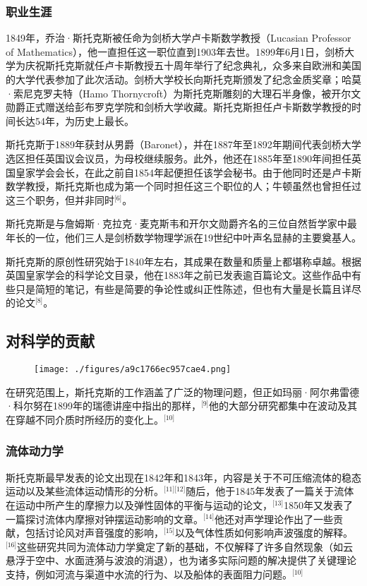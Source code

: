 \subsubsection{职业生涯}
1849年，乔治·斯托克斯被任命为剑桥大学卢卡斯数学教授（Lucasian Professor of Mathematics），他一直担任这一职位直到1903年去世。1899年6月1日，剑桥大学为庆祝斯托克斯就任卢卡斯教授五十周年举行了纪念典礼，众多来自欧洲和美国的大学代表参加了此次活动。剑桥大学校长向斯托克斯颁发了纪念金质奖章；哈莫·索尼克罗夫特（Hamo Thornycroft）为斯托克斯雕刻的大理石半身像，被开尔文勋爵正式赠送给彭布罗克学院和剑桥大学收藏。斯托克斯担任卢卡斯数学教授的时间长达54年，为历史上最长。

斯托克斯于1889年获封从男爵（Baronet），并在1887年至1892年期间代表剑桥大学选区担任英国议会议员，为母校继续服务。此外，他还在1885年至1890年间担任英国皇家学会会长，在此之前自1854年起便担任该学会秘书。由于他同时还是卢卡斯数学教授，斯托克斯也成为第一个同时担任这三个职位的人；牛顿虽然也曾担任过这三个职务，但并非同时\(^\text{[6]}\)。

斯托克斯是与詹姆斯·克拉克·麦克斯韦和开尔文勋爵齐名的三位自然哲学家中最年长的一位，他们三人是剑桥数学物理学派在19世纪中叶声名显赫的主要奠基人。

斯托克斯的原创性研究始于1840年左右，其成果在数量和质量上都堪称卓越。根据英国皇家学会的科学论文目录，他在1883年之前已发表逾百篇论文。这些作品中有些只是简短的笔记，有些是简要的争论性或纠正性陈述，但也有大量是长篇且详尽的论文\(^\text{[8]}\)。
\subsection{对科学的贡献}
\begin{figure}[ht]
\centering
\texttt{[image: ./figures/a9c1766ec957cae4.png]}
\caption{} \label{fig_QZstks_2}
\end{figure}
在研究范围上，斯托克斯的工作涵盖了广泛的物理问题，但正如玛丽·阿尔弗雷德·科尔努在1899年的瑞德讲座中指出的那样，\(^\text{[9]}\)他的大部分研究都集中在波动及其在穿越不同介质时所经历的变化上。\(^\text{[10]}\)
\subsubsection{流体动力学}
斯托克斯最早发表的论文出现在1842年和1843年，内容是关于不可压缩流体的稳态运动以及某些流体运动情形的分析。\(^\text{[11][12]}\)随后，他于1845年发表了一篇关于流体在运动中所产生的摩擦力以及弹性固体的平衡与运动的论文，\(^\text{[13]}\)1850年又发表了一篇探讨流体内摩擦对钟摆运动影响的文章。\(^\text{[14]}\)他还对声学理论作出了一些贡献，包括讨论风对声音强度的影响，\(^\text{[15]}\)以及气体性质如何影响声波强度的解释。\(^\text{[16]}\)这些研究共同为流体动力学奠定了新的基础，不仅解释了许多自然现象（如云悬浮于空中、水面涟漪与波浪的消退），也为诸多实际问题的解决提供了关键理论支持，例如河流与渠道中水流的行为、以及船体的表面阻力问题。\(^\text{[10]}\)

